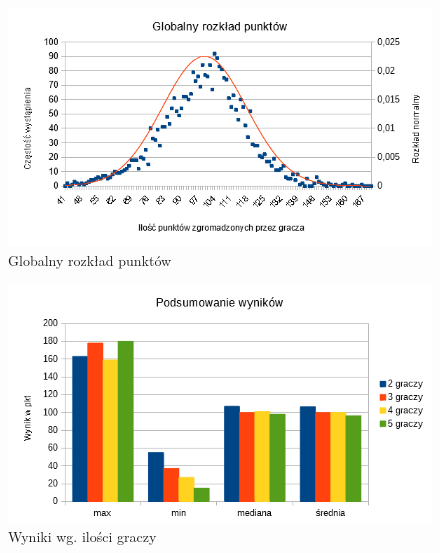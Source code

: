 \documentclass[12pt, oneside]{report}
\begin{document}
\begin{figure}[h]
	\includegraphics[width=\linewidth]{GaussNNWykrespunktowglobal.png}
	\caption{Globalny rozkład punktów}
	\label{figure:global_points_nn}
\end{figure}

\begin{figure}[h]
	\includegraphics[width=\linewidth]{NNWynikWPkt.png}
	\caption{Wyniki wg. ilości graczy}
	\label{figure:min_max_nn}
\end{figure}
\end{document}
